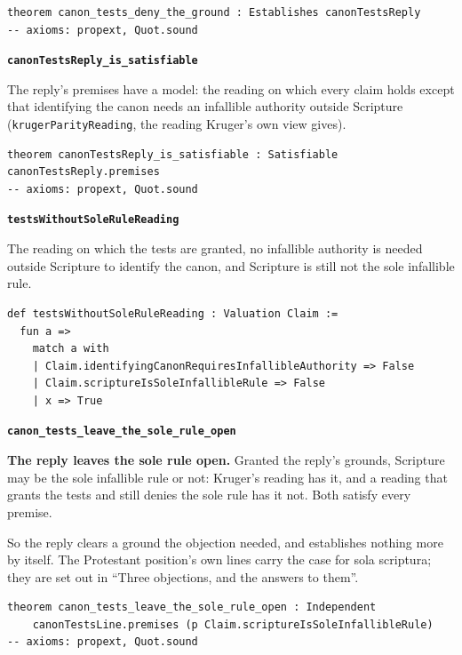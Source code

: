 \documentclass[11pt]{article}
\begin{document}
{\small\begin{verbatim}
theorem canon_tests_deny_the_ground : Establishes canonTestsReply
-- axioms: propext, Quot.sound
\end{verbatim}}
\par\medskip\noindent\textbf{\texttt{canon\allowbreak{}Tests\allowbreak{}Reply\_\allowbreak{}is\_\allowbreak{}satisfiable}}\par\nobreak\noindent
The reply’s premises have a model: the reading on which every claim holds except that identifying the canon needs an infallible authority outside Scripture (\texttt{kruger\allowbreak{}Parity\allowbreak{}Reading}, the reading Kruger’s own view gives).

{\small\begin{verbatim}
theorem canonTestsReply_is_satisfiable : Satisfiable canonTestsReply.premises
-- axioms: propext, Quot.sound
\end{verbatim}}
\par\medskip\noindent\textbf{\texttt{tests\allowbreak{}Without\allowbreak{}Sole\allowbreak{}Rule\allowbreak{}Reading}}\par\nobreak\noindent
The reading on which the tests are granted, no infallible authority is needed outside Scripture to identify the canon, and Scripture is still not the sole infallible rule.

{\small\begin{verbatim}
def testsWithoutSoleRuleReading : Valuation Claim :=
  fun a =>
    match a with
    | Claim.identifyingCanonRequiresInfallibleAuthority => False
    | Claim.scriptureIsSoleInfallibleRule => False
    | x => True
\end{verbatim}}
\par\medskip\noindent\textbf{\texttt{canon\_\allowbreak{}tests\_\allowbreak{}leave\_\allowbreak{}the\_\allowbreak{}sole\_\allowbreak{}rule\_\allowbreak{}open}}\par\nobreak\noindent
\textbf{The reply leaves the sole rule open.} Granted the reply’s grounds, Scripture may be the sole infallible rule or not: Kruger’s reading has it, and a reading that grants the tests and still denies the sole rule has it not. Both satisfy every premise.

So the reply clears a ground the objection needed, and establishes nothing more by itself. The Protestant position’s own lines carry the case for sola scriptura; they are set out in “Three objections, and the answers to them”.

{\small\begin{verbatim}
theorem canon_tests_leave_the_sole_rule_open : Independent
    canonTestsLine.premises (p Claim.scriptureIsSoleInfallibleRule)
-- axioms: propext, Quot.sound
\end{verbatim}}
\end{document}
